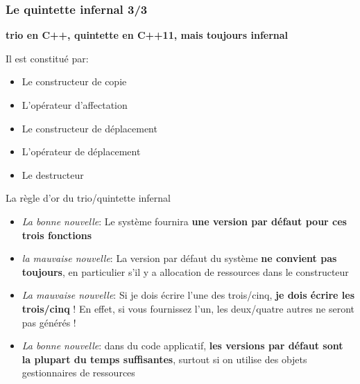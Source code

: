 \documentclass{beamer}
\begin{document}
\begin{frame}[fragile=singleslide,shrink=20]
\frametitle {Le quintette infernal 3/3}

\textbf{trio en C++, quintette en C++11, mais toujours infernal}

Il est constitué par:
\begin{itemize}
\item{Le constructeur de copie}
\item{L'opérateur d'affectation}
\item{Le constructeur de déplacement}
\item{L'opérateur de déplacement}
\item{Le destructeur}
\end{itemize}

\begin{block}{La règle d'or du trio/quintette infernal}
\begin{itemize}
\item{\textit{La bonne nouvelle}: Le système fournira \textbf{une version par défaut pour ces trois fonctions} }
\item{\textit{la mauvaise nouvelle}: La version par défaut du système \textbf{ne convient pas toujours}, en particulier s'il y a allocation de ressources dans le constructeur}
\item{\textit{La mauvaise nouvelle}: Si je dois écrire l'une des trois/cinq, \textbf{je dois écrire les trois/cinq} ! En effet, si vous fournissez l'un, les deux/quatre autres ne seront pas générés !}
\item{\textit{La bonne nouvelle}: dans du code applicatif, \textbf{les versions par défaut sont la plupart du temps suffisantes}, surtout si on utilise des objets gestionnaires de ressources}
\end{itemize}
\end{block}
\end{frame}
\end{document}
